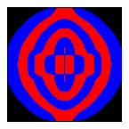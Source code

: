 \begin{figure}[p]
\begin{subfigure}[b]{0.3\textwidth}
    \end{subfigure}
    ~
    \begin{subfigure}[b]{0.3\textwidth}
        \includegraphics[width=\textwidth]{include/graphics/pml-off-2}
    \end{subfigure}
    

\end{figure}
